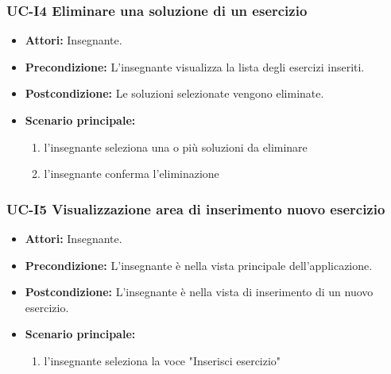 \subsubsection{UC-I4 Eliminare una soluzione di un esercizio}
\begin{itemize}
	\item \textbf{Attori:} Insegnante.
	\item \textbf{Precondizione:} L'insegnante visualizza la lista degli esercizi inseriti.
	\item \textbf{Postcondizione:} Le soluzioni selezionate vengono eliminate.
	\item \textbf{Scenario principale:}
		\begin{enumerate}
			\item l'insegnante seleziona una o più soluzioni da eliminare
			\item l'insegnante conferma l'eliminazione
		\end{enumerate}
\end{itemize}

\subsubsection{UC-I5 Visualizzazione area di inserimento nuovo esercizio}
\begin{itemize}
		\item \textbf{Attori: }Insegnante.
		\item \textbf{Precondizione: }L'insegnante è nella vista principale dell'applicazione.
		\item \textbf{Postcondizione: }L'insegnante è nella vista di inserimento di un nuovo esercizio.
		\item \textbf{Scenario principale: }
	\begin{enumerate} 
		\item l'insegnante seleziona la voce "Inserisci esercizio"
	\end{enumerate}
\end{itemize}


